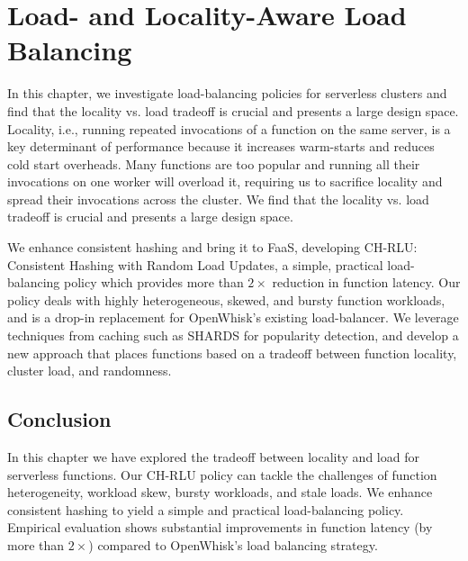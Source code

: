 \chapter{Load- and Locality-Aware Load Balancing}
\label{chap:chrlu}

In this chapter, we investigate load-balancing policies for serverless clusters and find that the locality vs. load tradeoff is crucial and presents a large design space.
Locality, i.e., running repeated invocations of a function on the same server, is a key determinant of performance because it increases warm-starts and reduces cold start overheads.
Many functions are too popular and running all their invocations on one worker will overload it, requiring us to sacrifice locality and spread their invocations across the cluster.
We find that the locality vs. load tradeoff is crucial and presents a large design space. 

We enhance consistent hashing and bring it to FaaS, developing CH-RLU: Consistent Hashing with Random Load Updates, a simple, practical load-balancing policy which provides more than $2\times$ reduction in function latency. 
Our policy deals with highly heterogeneous, skewed, and bursty function workloads, and is a drop-in replacement for OpenWhisk's existing load-balancer.
We leverage techniques from caching such as SHARDS for popularity detection, and develop a new approach that places functions based on a tradeoff between function locality, cluster load, and randomness. 



















\section{Conclusion}

In this chapter we have explored the tradeoff between locality and load for serverless functions. 
Our CH-RLU policy can tackle the challenges of function heterogeneity, workload skew, bursty workloads, and stale loads.
We enhance consistent hashing to yield a simple and practical load-balancing policy. 
Empirical evaluation shows substantial improvements in function latency (by more than $2\times$) compared to OpenWhisk's load balancing strategy.


